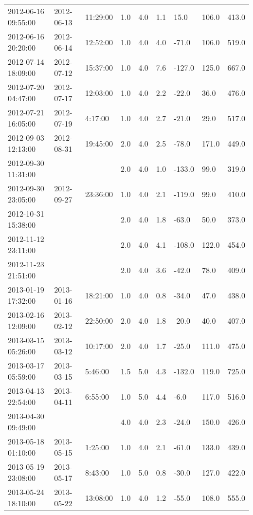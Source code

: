 \begin{longtable}{lllllllll}
        2012-06-16 09:55:00 & 2012-06-13 & 11:29:00 & 1.0 & 4.0 & 1.1 & 15.0 & 106.0 & 413.0 \\ 
        2012-06-16 20:20:00 & 2012-06-14 & 12:52:00 & 1.0 & 4.0 & 4.0 & -71.0 & 106.0 & 519.0 \\ 
        2012-07-14 18:09:00 & 2012-07-12 & 15:37:00 & 1.0 & 4.0 & 7.6 & -127.0 & 125.0 & 667.0 \\ 
        2012-07-20 04:47:00 & 2012-07-17 & 12:03:00 & 1.0 & 4.0 & 2.2 & -22.0 & 36.0 & 476.0 \\ 
        2012-07-21 16:05:00 & 2012-07-19 & 4:17:00 & 1.0 & 4.0 & 2.7 & -21.0 & 29.0 & 517.0 \\ 
        2012-09-03 12:13:00 & 2012-08-31 & 19:45:00 & 2.0 & 4.0 & 2.5 & -78.0 & 171.0 & 449.0 \\ 
        2012-09-30 11:31:00 & ~ & ~ & 2.0 & 4.0 & 1.0 & -133.0 & 99.0 & 319.0 \\ 
        2012-09-30 23:05:00 & 2012-09-27 & 23:36:00 & 1.0 & 4.0 & 2.1 & -119.0 & 99.0 & 410.0 \\ 
        2012-10-31 15:38:00 & ~ & ~ & 2.0 & 4.0 & 1.8 & -63.0 & 50.0 & 373.0 \\ 
        2012-11-12 23:11:00 & ~ & ~ & 2.0 & 4.0 & 4.1 & -108.0 & 122.0 & 454.0 \\ 
        2012-11-23 21:51:00 & ~ & ~ & 2.0 & 4.0 & 3.6 & -42.0 & 78.0 & 409.0 \\ 
        2013-01-19 17:32:00 & 2013-01-16 & 18:21:00 & 1.0 & 4.0 & 0.8 & -34.0 & 47.0 & 438.0 \\ 
        2013-02-16 12:09:00 & 2013-02-12 & 22:50:00 & 2.0 & 4.0 & 1.8 & -20.0 & 40.0 & 407.0 \\ 
        2013-03-15 05:26:00 & 2013-03-12 & 10:17:00 & 2.0 & 4.0 & 1.7 & -25.0 & 111.0 & 475.0 \\ 
        2013-03-17 05:59:00 & 2013-03-15 & 5:46:00 & 1.5 & 5.0 & 4.3 & -132.0 & 119.0 & 725.0 \\ 
        2013-04-13 22:54:00 & 2013-04-11 & 6:55:00 & 1.0 & 5.0 & 4.4 & -6.0 & 117.0 & 516.0 \\ 
        2013-04-30 09:49:00 & ~ & ~ & 4.0 & 4.0 & 2.3 & -24.0 & 150.0 & 426.0 \\ 
        2013-05-18 01:10:00 & 2013-05-15 & 1:25:00 & 1.0 & 4.0 & 2.1 & -61.0 & 133.0 & 439.0 \\ 
        2013-05-19 23:08:00 & 2013-05-17 & 8:43:00 & 1.0 & 5.0 & 0.8 & -30.0 & 127.0 & 422.0 \\ 
        2013-05-24 18:10:00 & 2013-05-22 & 13:08:00 & 1.0 & 4.0 & 1.2 & -55.0 & 108.0 & 555.0 \\ 

\end{longtable}
